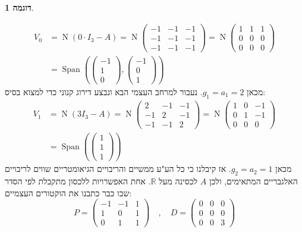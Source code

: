 \documentclass[12pt]{report}
\theoremstyle{plain}
\theoremstyle{definition}
\newtheorem{example}{דוגמה}[chapter]
\newcommand{\R}{\mathbb{R}}
\newcommand{\0}{\mathbf{0}}
\DeclareMathOperator{\Span}{Span}
\DeclareMathOperator{\Null}{N}
\begin{document}
\begin{example}
\begin{enumerate}[label=\alph*.]
$$
\begin{aligned}
V_0&=\Null(0\cdot I_3-A)=\Null\begin{pmatrix}
-1 & -1 & -1\\
-1 & -1 & -1\\
-1 & -1 & -1
\end{pmatrix}=\Null\begin{pmatrix}
1 & 1 & 1\\
0 & 0 & 0\\
0 & 0 & 0
\end{pmatrix}\\
&=\Span\left(\begin{pmatrix}-1\\1\\0\end{pmatrix},\begin{pmatrix}-1\\0\\1\end{pmatrix}\right)
\end{aligned}
$$
מכאן 
$g_1=a_1=2$.
נעבור למרחב העצמי הבא ונבצע דירוג קנוני כדי למצוא בסיס:
$$
\begin{aligned}
V_1&=\Null(3I_3-A)=\Null\begin{pmatrix}
2 & -1 & -1\\
-1 & 2 & -1\\
-1 & -1 & 2
\end{pmatrix}=\Null\begin{pmatrix}
1 & 0 & -1\\
0 & 1 & -1\\
0 & 0 & 0
\end{pmatrix}\\
&=\Span\left(\begin{pmatrix}1\\1\\1\end{pmatrix}\right)
\end{aligned}
$$
מכאן
$g_2=a_2=1$. 
אז קיבלנו כי כל הע"ע ממשיים והריבויים הגיאומטריים שווים לריבויים האלגבריים המתאימים, ולכן 
$A$
לכסינה מעל
$\R$.
אחת האפשרויות ללכסון מתקבלת לפי הסדר שבו כבר כתבנו את הוקטורים העצמיים:
$$
P=\begin{pmatrix}
-1 & -1 & 1\\
1 & 0 & 1\\
0 & 1 & 1
\end{pmatrix}\quad,\quad D=\begin{pmatrix}
0 & 0 & 0\\
0 & 0 & 0\\
0 & 0 & 3
\end{pmatrix}
$$


\end{enumerate}
\end{example}
\end{document}

